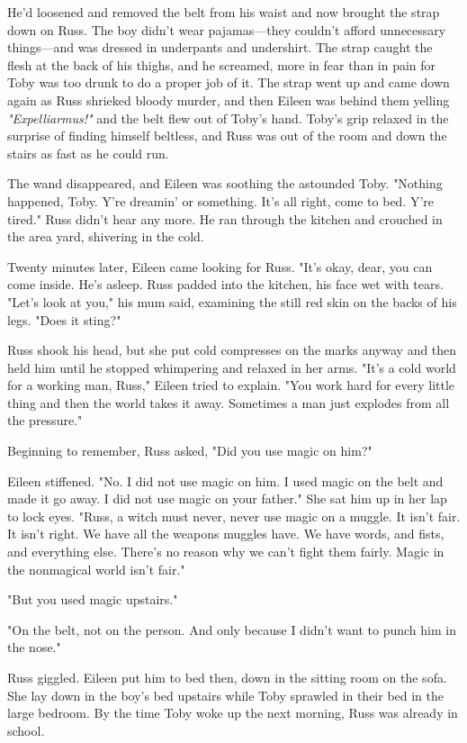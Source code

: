 He'd loosened and removed the belt from his waist and now brought the strap down on Russ. The boy didn't wear pajamas—they couldn't afford unnecessary things—and was dressed in underpants and undershirt. The strap caught the flesh at the back of his thighs, and he screamed, more in fear than in pain for Toby was too drunk to do a proper job of it. The strap went up and came down again as Russ shrieked bloody murder, and then Eileen was behind them yelling \emph{"Expelliarmus!"} and the belt flew out of Toby's hand. Toby's grip relaxed in the surprise of finding himself beltless, and Russ was out of the room and down the stairs as fast as he could run.

The wand disappeared, and Eileen was soothing the astounded Toby. "Nothing happened, Toby. Y're dreamin' or something. It's all right, come to bed. Y're tired." Russ didn't hear any more. He ran through the kitchen and crouched in the area yard, shivering in the cold.

Twenty minutes later, Eileen came looking for Russ. "It's okay, dear, you can come inside. He's asleep. Russ padded into the kitchen, his face wet with tears. "Let's look at you," his mum said, examining the still red skin on the backs of his legs. "Does it sting?"

Russ shook his head, but she put cold compresses on the marks anyway and then held him until he stopped whimpering and relaxed in her arms. "It's a cold world for a working man, Russ," Eileen tried to explain. "You work hard for every little thing and then the world takes it away. Sometimes a man just explodes from all the pressure."

Beginning to remember, Russ asked, "Did you use magic on him?"

Eileen stiffened. "No. I did not use magic on him. I used magic on the belt and made it go away. I did not use magic on your father." She sat him up in her lap to lock eyes. "Russ, a witch must never, never use magic on a muggle. It isn't fair. It isn't right. We have all the weapons muggles have. We have words, and fists, and everything else. There's no reason why we can't fight them fairly. Magic in the nonmagical world isn't fair."

"But you used magic upstairs."

"On the belt, not on the person. And only because I didn't want to punch him in the nose."

Russ giggled. Eileen put him to bed then, down in the sitting room on the sofa. She lay down in the boy's bed upstairs while Toby sprawled in their bed in the large bedroom. By the time Toby woke up the next morning, Russ was already in school.


